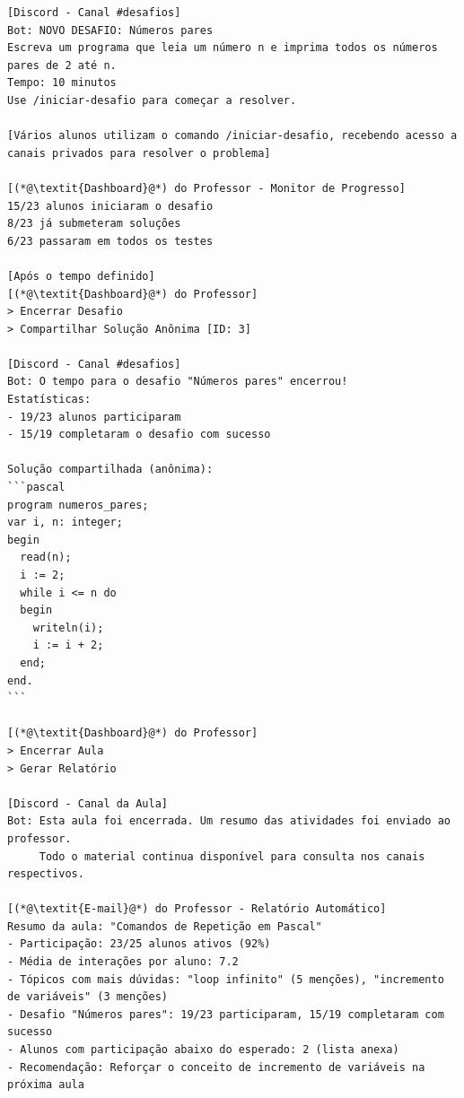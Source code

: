 \begin{lstlisting}
[Discord - Canal #desafios]
Bot: NOVO DESAFIO: Números pares
Escreva um programa que leia um número n e imprima todos os números pares de 2 até n.
Tempo: 10 minutos
Use /iniciar-desafio para começar a resolver.

[Vários alunos utilizam o comando /iniciar-desafio, recebendo acesso a canais privados para resolver o problema]

[(*@\textit{Dashboard}@*) do Professor - Monitor de Progresso]
15/23 alunos iniciaram o desafio
8/23 já submeteram soluções
6/23 passaram em todos os testes

[Após o tempo definido]
[(*@\textit{Dashboard}@*) do Professor]
> Encerrar Desafio
> Compartilhar Solução Anônima [ID: 3]

[Discord - Canal #desafios]
Bot: O tempo para o desafio "Números pares" encerrou!
Estatísticas:
- 19/23 alunos participaram
- 15/19 completaram o desafio com sucesso

Solução compartilhada (anônima):
```pascal
program numeros_pares;
var i, n: integer;
begin
  read(n);
  i := 2;
  while i <= n do
  begin
    writeln(i);
    i := i + 2;
  end;
end.
```

[(*@\textit{Dashboard}@*) do Professor]
> Encerrar Aula
> Gerar Relatório

[Discord - Canal da Aula]
Bot: Esta aula foi encerrada. Um resumo das atividades foi enviado ao professor.
     Todo o material continua disponível para consulta nos canais respectivos.

[(*@\textit{E-mail}@*) do Professor - Relatório Automático]
Resumo da aula: "Comandos de Repetição em Pascal"
- Participação: 23/25 alunos ativos (92%)
- Média de interações por aluno: 7.2
- Tópicos com mais dúvidas: "loop infinito" (5 menções), "incremento de variáveis" (3 menções)
- Desafio "Números pares": 19/23 participaram, 15/19 completaram com sucesso
- Alunos com participação abaixo do esperado: 2 (lista anexa)
- Recomendação: Reforçar o conceito de incremento de variáveis na próxima aula
\end{lstlisting}
